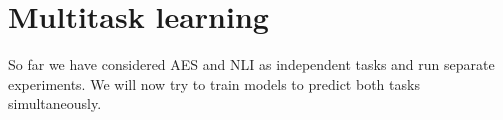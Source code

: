 \chapter{Multitask learning}

So far we have considered \ac{AES} and \ac{NLI} as independent tasks and run
separate experiments. We will now try to train models to predict both tasks
simultaneously.
